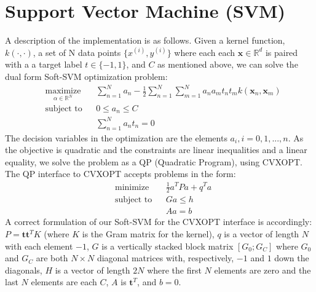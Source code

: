 \documentclass[10pt]{article}
\begin{document}
\section{Support Vector Machine (SVM)}


A description of the implementation is as follows.  Given a kernel function, $k(\cdot,\cdot)$, a set of N data points $\{x^{(i)}, y^{(i)}\}$ where each each $\mathbf{x} \in \mathbb{R}^d$ is paired with a a target label $t \in \{-1,1\}$, and $C$ as mentioned above, we can solve the dual form Soft-SVM optimization problem:
%
\begin{equation}
\begin{aligned}
& \underset{\alpha \in \mathbb{R}^N}{\text{maximize}} && \sum_{n=1}^N a_n - \frac{1}{2} \sum_{n=1}^N \sum_{m=1}^N a_na_mt_nt_mk(\mathbf{x}_n, \mathbf{x}_m)\\
& \text{subject to}
&& 0 \le a_n \le C \\
&&&\sum_{n=1}^N a_nt_n = 0
\end{aligned}
\end{equation}
%
The decision variables in the optimization are the elements $a_i, i =0,1,...,n$.  As the objective is quadratic and the constraints are linear inequalities and a linear equality, we solve the problem as a QP (Quadratic Program), using CVXOPT.  The QP interface to CVXOPT accepts problems in the form:
\begin{equation}
\begin{aligned}
& \text{minimize} && \frac{1}{2}a^TPa + q^Ta\\
& \text{subject to}
&& Ga \le h \\
&&& Aa = b
\end{aligned}
\end{equation}
A correct formulation of our Soft-SVM for the CVXOPT interface is accordingly: $P = \mathbf{t}\mathbf{t}^T K$ (where $K$ is the Gram matrix for the kernel), $q$ is a vector of length $N$ with each element $-1$, $G$ is a vertically stacked block matrix $[G_0; G_C]$ where $G_0$ and $G_C$ are both $N \times N$ diagonal matrices with, respectively, $-1$ and $1$ down the diagonals,  $H$ is a vector of length $2N$ where the first $N$ elements are zero and the last $N$ elements are each $C$, $A$ is $\mathbf{t}^T$, and $b = 0$.
\end{document}
